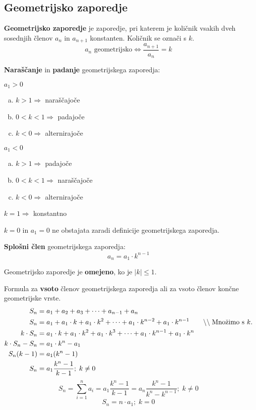 \documentclass[a4paper,oneside,12pt,fleqn]{article}
\newcommand\krat\cdot
\newcommand{\comment}[1]{\ensuremath{\qquad\backslash\backslash\;}\textnormal{#1}}
\renewcommand\implies\Rightarrow
\renewcommand\iff\Leftrightarrow
\numberwithin{equation}{section}
\newenvironment{enumerate*}%
{
\vspace{-12pt}%
\begin{enumerate}%
\setlength{\itemsep}{0pt}%
\setlength{\parskip}{2pt}}%
{\end{enumerate}}
\begin{document}
\subsection{Geometrijsko zaporedje}
\label{sec:zap:geom}
\textbf{Geometrijsko zaporedje} je zaporedje, pri katerem je količnik vsakih dveh sosednjih členov
$a_n$ in $a_{n+1}$ konstanten. Količnik se označi s $k$.
\[ a_n \text{ geometrijsko} \iff \frac{a_{n+1}}{a_n} = k \]

\textbf{Naraščanje} in \textbf{padanje} geometrijskega zaporedja:
\begin{enumerate*}
  \item $a_1 > 0$
    \begin{enumerate}[a)]
      \item $k > 1 \implies $ naraščajoče
      \item $0 < k < 1 \implies $ padajoče
      \item $k < 0 \implies $ alternirajoče
    \end{enumerate}
  \item $a_1 < 0$
    \begin{enumerate}[a)]
      \item $k > 1 \implies $ padajoče
      \item $0 < k < 1 \implies $ naraščajoče
      \item $k < 0 \implies $ alternirajoče
    \end{enumerate}
  \item $k = 1 \implies $ konstantno
  \item $k = 0$ in $a_1 = 0$ ne obstajata zaradi definicije geometrijskega zaporedja.
\end{enumerate*}

\textbf{Splošni člen} geometrijskega zaporedja:
\[ a_n = a_1\krat k^{n-1} \]

Geometrijsko zaporedje je \textbf{omejeno}, ko je $\left| k \right| \le 1$.

Formula za \textbf{vsoto} členov geometrijskega zaporedja ali za vsoto členov končne
geometrijske vrste.
\begin{align*}
  S_n &= a_1 + a_2 + a_3 + \cdots + a_{n-1} + a_n \\
  S_n &= a_1 + a_1\krat k + a_1\krat k^2 + \cdots + a_1\krat k^{n-2} + a_1\krat k^{n-1}
  \comment{Množimo s $k$.}\\
  k\krat S_n &= a_1\krat k + a_1\krat k^2 + a_1\krat k^3 + \cdots + a_1\krat k^{n-1} + a_1\krat
  k^n \\
  k\krat S_n - S_n &=  a_1 \krat k^n - a_1 \\
  S_n(k-1) &= a_1(k^n -1) \\
  S_n &= a_1\frac{k^n - 1}{k-1}; \; k \neq 0
\end{align*}
\begin{equation}
  S_n = \sum_{i=1}^n a_i = a_1\frac{k^n-1}{k-1} = a_n\frac{k^n -1}{k^n - k^{n-1}}; \; k \neq 0
  \label{eq:zap:geomsum}
\end{equation}
\[ S_n = n\krat a_1; \; k = 0 \]
\end{document}
